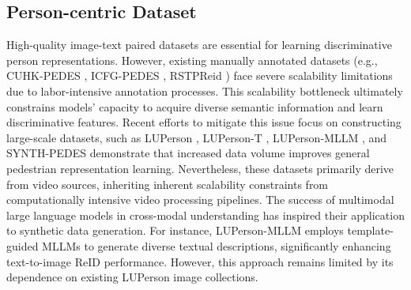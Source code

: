 \subsection{Person-centric Dataset}
High-quality image-text paired datasets are essential for learning discriminative person representations. However, existing manually annotated datasets (e.g., CUHK-PEDES \cite{li2017person}, ICFG-PEDES \cite{ding2021semantically}, RSTPReid \cite{zhu2021dssl}) face severe scalability limitations due to labor-intensive annotation processes. This scalability bottleneck ultimately constrains models' capacity to acquire diverse semantic information and learn discriminative features. Recent efforts to mitigate this issue focus on constructing large-scale datasets, such as LUPerson \cite{fu2021unsupervised}, LUPerson-T \cite{shao2023unified}, LUPerson-MLLM \cite{tan2024harnessing}, and SYNTH-PEDES \cite{zuo2024plip} demonstrate that increased data volume improves general pedestrian representation learning. Nevertheless, these datasets primarily derive from video sources, inheriting inherent scalability constraints from computationally intensive video processing pipelines. The success of multimodal large language models in cross-modal understanding \cite{yu2024capsfusion} has inspired their application to synthetic data generation. For instance, LUPerson-MLLM \cite{tan2024harnessing} employs template-guided MLLMs to generate diverse textual descriptions, significantly enhancing text-to-image ReID performance. However, this approach remains limited by its dependence on existing LUPerson image collections.

